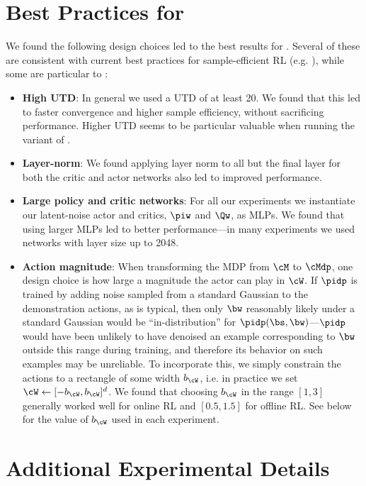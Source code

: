 \section{Best Practices for \algname}
We found the following design choices led to the best results for \algname. Several of these are consistent with current best practices for sample-efficient RL (e.g. \cite{ball2023efficient}), while some are particular to \algname:
\begin{itemize}
    \item \textbf{High UTD}: In general we used a UTD of at least 20. We found that this led to faster convergence and higher sample efficiency, without sacrificing performance. Higher UTD seems to be particular valuable when running the \algnamena variant of \algname.
    \item \textbf{Layer-norm}: We found applying layer norm to all but the final layer for both the critic and actor networks also led to improved performance.
    \item \textbf{Large policy and critic networks}: For all our experiments we instantiate our latent-noise actor and critics, $\piw$ and $\Qw$, as MLPs. We found that using larger MLPs led to better performance---in many experiments we used networks with layer size up to 2048.
    \item \textbf{Action magnitude}: When transforming the MDP from $\cM$ to $\cMdp$, one design choice is how large a magnitude the actor can play in $\cW$. If $\pidp$ is trained by adding noise sampled from a standard Gaussian to the demonstration actions, as is typical, then only $\bw$ reasonably likely under a standard Gaussian would be ``in-distribution'' for $\pidp(\bs,\bw)$---$\pidp$ would have been unlikely to have denoised an example corresponding to $\bw$ outside this range during training, and therefore its behavior on such examples may be unreliable. To incorporate this, we simply constrain the actions to a rectangle of some width $\actmag$, i.e. in practice we set $\cW \leftarrow [-\actmag, \actmag]^d$. We found that choosing $\actmag$ in the range $[1,3]$ generally worked well for online RL and $[0.5,1.5]$ for offline RL. See below for the value of $\actmag$ used in each experiment.
\end{itemize}








\section{Additional Experimental Details}




